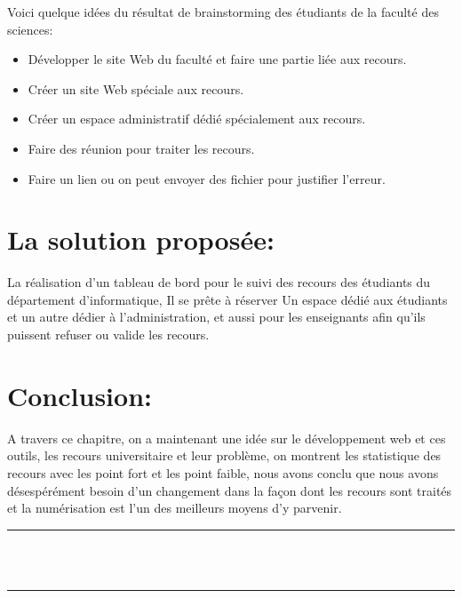 \documentclass[12pt]{report}
\begin{document}
Voici quelque idées du résultat de brainstorming des étudiants de la faculté des sciences:
\begin{itemize}
    \item Développer le site Web du faculté et faire une partie liée aux recours.
    \item Créer un site Web spéciale aux recours.
    \item Créer un espace administratif dédié spécialement aux recours.
    \item Faire des réunion pour traiter les recours.
    \item Faire un lien ou on peut envoyer des fichier pour justifier l'erreur.
\end{itemize}

\section{La solution proposée:}
\hspace{0.12in}
La réalisation d’un tableau de bord pour le suivi des recours des étudiants du département d’informatique, Il se prête à réserver Un espace dédié aux étudiants et un autre dédier à l’administration, et aussi pour les enseignants afin qu'ils puissent refuser ou valide les recours.

\section{Conclusion:}
\hspace{0.12in}
A travers ce chapitre, on a maintenant une idée sur le développement web et ces outils, les recours universitaire et leur problème, on montrent les statistique des recours avec les point fort et les point faible, nous avons conclu que nous avons désespérément besoin d'un changement dans la façon dont les recours sont traités et la numérisation est l'un des meilleurs moyens d'y parvenir.

\newpage

\vspace*{\fill}
\begin{center}
    {\color{Blue} \rule{\linewidth}{1.2mm} }\\
\vspace{0.25in}
    {\centering{}}
\vspace{0.35in}\\
    {\color{Blue} \rule{\linewidth}{1.2mm} }
\end{center}
\vspace*{\fill}
\setcounter{section}{0}
\end{document}
